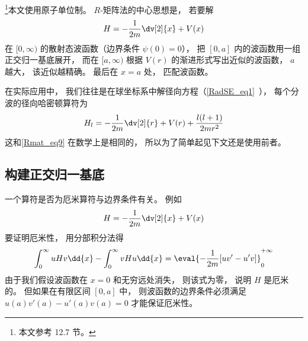 

\footnote{本文参考 \cite{Bransden} 12.7 节。}本文使用原子单位制。 $R$-矩阵法的中心思想是， 若要解
\begin{equation}\label{Rmat_eq9}
H = -\frac{1}{2m}\dv[2]{x} + V(x)
\end{equation}
在 $[0, \infty)$ 的散射态波函数（边界条件 $\psi(0) = 0$）， 把 $[0,a]$ 内的波函数用一组正交归一基底展开， 而在 $[a,\infty)$ 根据 $V(r)$ 的渐进形式写出近似的波函数， $a$ 越大， 该近似越精确。 最后在 $x=a$ 处， 匹配波函数。

在实际应用中， 我们往往是在球坐标系中解径向方程（\autoref{RadSE_eq1}~）， 每个分波的径向哈密顿算符为
\begin{equation}
H_l = -\frac{1}{2m} \dv[2]{r} + V(r) + \frac{l(l + 1)}{2mr^2}
\end{equation}
这和\autoref{Rmat_eq9} 在数学上是相同的， 所以为了简单起见下文还是使用前者。

\subsection{构建正交归一基底}
一个算符是否为厄米算符与边界条件有关。 例如
\begin{equation}
H = -\frac{1}{2m}\dv[2]{x} + V(x)
\end{equation}
要证明厄米性， 用分部积分法得
\begin{equation}\label{Rmat_eq1}
\int_{0}^{\infty} uHv\dd{x} - \int_{0}^{\infty} vHu\dd{x}
= \eval{-\frac{1}{2m}[uv' - u'v]}_{0}^{+\infty}
\end{equation}
由于我们假设波函数在 $x=0$ 和无穷远处消失， 则该式为零， 说明 $H$ 是厄米的。 但如果在有限区间 $[0, a]$ 中， 则波函数的边界条件必须满足 $u(a)v'(a) - u'(a)v(a) = 0$ 才能保证厄米性。

